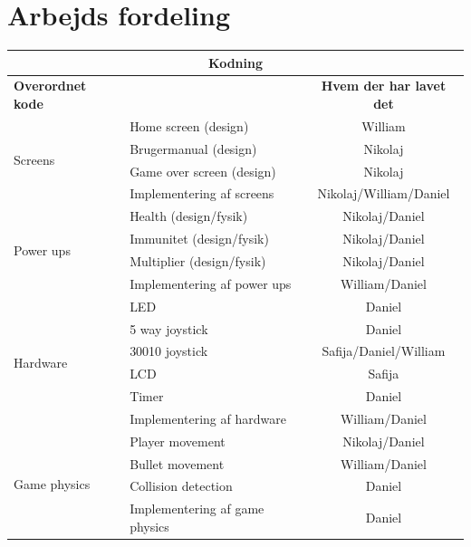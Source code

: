 \chapter{Arbejds fordeling}

\begin{table}[h]
\centering
\renewcommand{\arraystretch}{1.5}
\begin{tabular}{|l|l|c|}
\hline
\multicolumn{3}{|c|}{\textbf{\Large Kodning}} \\ \hline
\textbf{Overordnet kode} & & \textbf{Hvem der har lavet det} \\ \hline

\multirow{4}{*}{Screens}
 & Home screen (design) & William \\ \cline{2-3}
 & Brugermanual (design) & Nikolaj \\ \cline{2-3}
 & Game over screen (design) & Nikolaj \\ \cline{2-3}
 & Implementering af screens &  Nikolaj/William/Daniel \\ \hline

\multirow{4}{*}{Power ups}
 & Health (design/fysik) & Nikolaj/Daniel \\ \cline{2-3}
 & Immunitet (design/fysik) & Nikolaj/Daniel \\ \cline{2-3}
 & Multiplier (design/fysik) & Nikolaj/Daniel \\ \cline{2-3}
 & Implementering af power ups & William/Daniel \\ \hline

\multirow{6}{*}{Hardware}
 & LED & Daniel \\ \cline{2-3}
 & 5 way joystick & Daniel \\ \cline{2-3}
 & 30010 joystick & Safija/Daniel/William \\ \cline{2-3}
 & LCD & Safija \\ \cline{2-3}
 & Timer & Daniel \\ \cline{2-3}
 & Implementering af hardware & William/Daniel \\ \hline

\multirow{4}{*}{Game physics}
 & Player movement &  Nikolaj/Daniel \\ \cline{2-3}
 & Bullet movement &  William/Daniel \\ \cline{2-3}
 & Collision detection & Daniel \\ \cline{2-3}
 & Implementering af game physics &  Daniel \\ \hline

\end{tabular}
\end{table}


